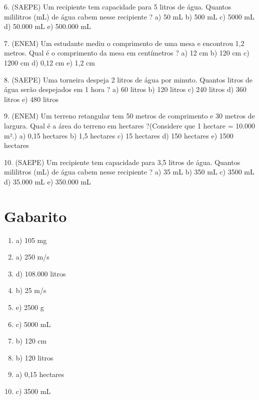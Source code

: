 \documentclass[12pt]{article}
\begin{document}
\begin{multicols}{2}
6. (SAEPE) Um recipiente tem capacidade para 5 litros de água. Quantos mililitros (mL) de água cabem nesse recipiente ?\newline  
a) 50 mL  
b) 500 mL  
c) 5000 mL  
d) 50.000 mL  
e) 500.000 mL  
\vspace{0.5cm}

7. (ENEM) Um estudante mediu o comprimento de uma mesa e encontrou 1,2 metros. Qual é o comprimento da mesa em centímetros ?\newline  
a) 12 cm  
b) 120 cm  
c) 1200 cm  
d) 0,12 cm  
e) 1,2 cm  
\vspace{0.5cm}

8. (SAEPE) Uma torneira despeja 2 litros de água por minuto. Quantos litros de água serão despejados em 1 hora ?\newline  
a) 60 litros  
b) 120 litros  
c) 240 litros  
d) 360 litros  
e) 480 litros  
\vspace{0.5cm}

9. (ENEM) Um terreno retangular tem 50 metros de comprimento e 30 metros de largura. Qual é a área do terreno em hectares ?\newline (Considere que 1 hectare = 10.000 m².)  
a) 0,15 hectares  
b) 1,5 hectares  
c) 15 hectares  
d) 150 hectares  
e) 1500 hectares  
\vspace{0.5cm}

10. (SAEPE) Um recipiente tem capacidade para 3,5 litros de água. Quantos mililitros (mL) de água cabem nesse recipiente ?\newline  
a) 35 mL  
b) 350 mL  
c) 3500 mL  
d) 35.000 mL  
e) 350.000 mL  
\vspace{0.5cm}

\end{multicols}

\newpage %

\section*{Gabarito}

\begin{enumerate}
    \item a) 105 mg  
    \item a) 250 m/s  
    \item d) 108.000 litros  
    \item b) 25 m/s  
    \item e) 2500 g  
    \item c) 5000 mL  
    \item b) 120 cm  
    \item b) 120 litros  
    \item a) 0,15 hectares  
    \item c) 3500 mL  
\end{enumerate}
\end{document}
